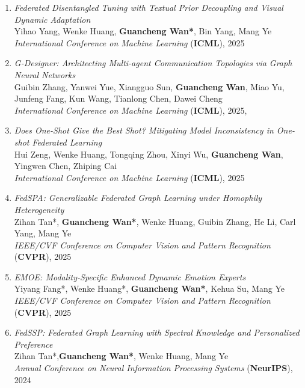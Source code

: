 \begin{enumerate}
    \item \textit{Federated Disentangled Tuning with Textual Prior Decoupling and Visual Dynamic Adaptation} \\
    Yihao Yang, Wenke Huang, \textbf{Guancheng Wan*}, Bin Yang, Mang Ye \\
    \hfill \textit{International Conference on Machine Learning} (\textbf{ICML}), 2025

    \item \textit{G-Designer: Architecting Multi-agent Communication Topologies via Graph Neural Networks} \\
    Guibin Zhang, Yanwei Yue, Xiangguo Sun, \textbf{Guancheng Wan}, Miao Yu, Junfeng Fang, Kun Wang, Tianlong Chen, Dawei Cheng \\
    \hfill \textit{International Conference on Machine Learning} (\textbf{ICML}), 2025, {}

    \item \textit{Does One-Shot Give the Best Shot? Mitigating Model Inconsistency in One-shot Federated Learning} \\
    Hui Zeng, Wenke Huang, Tongqing Zhou, Xinyi Wu, \textbf{Guancheng Wan}, Yingwen Chen, Zhiping Cai \\
    \hfill \textit{International Conference on Machine Learning} (\textbf{ICML}), 2025

    \item \textit{FedSPA: Generalizable Federated Graph Learning under Homophily Heterogeneity} \\
    Zihan Tan*, \textbf{Guancheng Wan*}, Wenke Huang, Guibin Zhang, He Li, Carl Yang, Mang Ye \\
    \hfill \textit{IEEE/CVF Conference on Computer Vision and Pattern Recognition} (\textbf{CVPR}), 2025

    \item \textit{EMOE: Modality-Specific Enhanced Dynamic Emotion Experts} \\
    Yiyang Fang*, Wenke Huang*, \textbf{Guancheng Wan*}, Kehua Su, Mang Ye \\
    \hfill \textit{IEEE/CVF Conference on Computer Vision and Pattern Recognition} (\textbf{CVPR}), 2025

    \item \textit{FedSSP: Federated Graph Learning with Spectral Knowledge and Personalized Preference} \\
    Zihan Tan*,\textbf{Guancheng Wan*}, Wenke Huang, Mang Ye \\
    \hfill \textit{Annual Conference on Neural Information Processing Systems} (\textbf{NeurIPS}), 2024


\end{enumerate}
